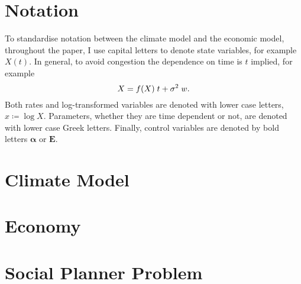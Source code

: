 \documentclass[american, abstract=off]{scrartcl}
\let\d\relax
\newcommand{\d}[1]{\mathrm{d}#1}
\newcommand{\control}[1]{\bm{#1}}
\begin{document}
\section{Notation}

To standardise notation between the climate model and the economic model, throughout the paper, I use capital letters to denote state variables, for example $X(t)$. In general, to avoid congestion the dependence on time is $t$ implied, for example \begin{equation}
  \d{X} = f(X) \; \d{t} + \sigma^2 \; \d{w}.
\end{equation} Both rates and log-transformed variables are denoted with lower case letters, $x \coloneqq \log X$. Parameters, whether they are time dependent or not, are denoted with lower case Greek letters. Finally, control variables are denoted by bold letters $\control{\alpha}$ or $\control{E}$.

\section{Climate Model}



\section{Economy}



\section{Social Planner Problem}



\iffalse
  \nocite{*}
  \newpage
  \printbibliography
\fi
\end{document}
